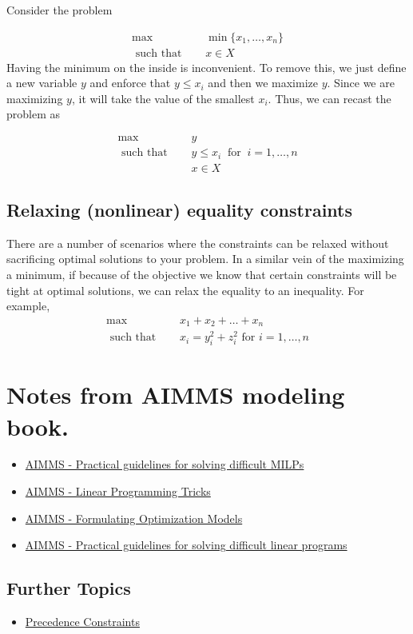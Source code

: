 \documentclass[../open-optimization/open-optimization.tex]{subfiles}
\begin{document}
Consider the problem 

\begin{align*}
\max   \quad & \min \{x_1, \dots, x_n\}\\
\text{ such that } \quad &  x \in X
\end{align*}
Having the minimum on the inside is inconvenient.  To remove this, we just define a new variable $y$ and enforce that $y \leq x_i$ and then we maximize $y$.  Since we are maximizing $y$, it will take the value of the smallest $x_i$.  Thus, we can recast the problem as

\begin{align*}
\max\quad    & y\\
\text{ such that } \quad  & y \leq x_i \ \text{ for }\  i=1, \dots, n \\
&  x \in X
\end{align*}


\subsection{Relaxing (nonlinear) equality constraints}

There are a number of scenarios where the constraints can be relaxed without sacrificing optimal solutions to your problem.   In a similar vein of the maximizing a minimum, if because of the objective we know that certain constraints will be tight at optimal solutions, we can relax the equality to an inequality.   For example, 
\begin{align*}
\max   \quad &x_1 + x_2 +  \dots + x_n\\
\text{ such that } \quad &  x_i = y_i^2 + z_i^2 \text{ for } i=1, \dots, n
\end{align*}






\section{Notes from AIMMS modeling book.}
\begin{itemize}

\item \href{http://inside.mines.edu/~anewman/MIP_practice120212.pdf}{AIMMS - Practical guidelines for solving difficult MILPs}

\item \href{https://download.aimms.com/aimms/download/manuals/AIMMS3OM_LinearProgrammingTricks.pdf}{AIMMS - Linear Programming Tricks}


\item  \href{https://download.aimms.com/aimms/download/manuals/AIMMS3OM_FormulatingOptimizationModels.pdf}{AIMMS - Formulating Optimization Models}


\item \href{https://pdfs.semanticscholar.org/b01f/ad44c20c372fdda95cbfb980c0d37302de07.pdf}{AIMMS - Practical guidelines for solving difficult linear programs}
\end{itemize}
\subsection{Further Topics}
\begin{itemize}
\item \href{https://or.stackexchange.com/questions/1319/best-model-for-precedence-constraints-within-scheduling-problem}{Precedence Constraints}
\end{itemize}
\end{document}

